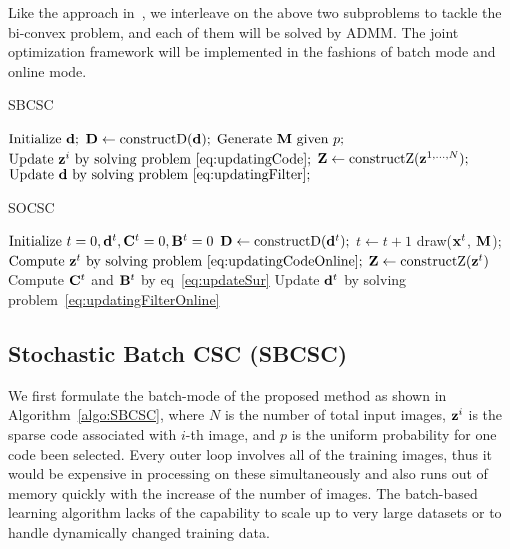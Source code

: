 Like the approach in~\cite{heide2015fast}, we interleave on the above two subproblems to tackle the bi-convex problem, and each of them will be solved by ADMM. The joint optimization framework will be implemented in the fashions of batch mode and online mode.

\begin{minipage}[t]{0.5\textwidth}
\vspace{0pt}
\begin{algorithm}[H]
\caption{SBCSC} \label{algo:SBCSC}
\begin{algorithmic}[1]
\State $\text{Initialize} ~ \filter;$
    \State $\Filter \gets \text{constructD}(\filter);$
        \State $ \text{Generate } \mask \text{ given } p;$
        \State $ \text{Update } \code^i \text{ by solving problem~\ref{eq:updatingCode}};$
    \EndFor
    \State $\Code \gets \text{constructZ}(\code^{1,...,N});$
    \State $\text{Update } \filter \text{ by solving problem~\ref{eq:updatingFilter}} ;$
\EndWhile
\end{algorithmic}
\end{algorithm}
\end{minipage}
\begin{minipage}[t]{0.5\textwidth}
\vspace{0pt}
\begin{algorithm}[H]
\caption{SOCSC} \label{algo:SOCSC}
\begin{algorithmic}[1]
\State $\text{Initialize} ~ t=0, \filter^t,  \surC^t = 0, \surB^t = 0$
    \State $\Filter \gets \text{constructD}(\filter^t);$
    \State $t \gets t+1$
    \State draw($\signal^t$, $\mask$);
    \State $ \text{Compute } \code^t \text{ by solving problem~\ref{eq:updatingCodeOnline}};$
    \State $\Code \gets \text{constructZ}(\code^t)$
    \State Compute $\surC^t$ and $\surB^t$ by eq~\ref{eq:updateSur}
    \State Update $\filter^t$ by solving problem~\ref{eq:updatingFilterOnline}
\EndWhile
\end{algorithmic}
\end{algorithm}
\end{minipage}

\subsection{Stochastic Batch CSC (SBCSC)}
We first formulate the batch-mode of the proposed method as shown in Algorithm~\ref{algo:SBCSC}, where $N$ is the number of total input images, $\code^i$ is the sparse code associated with $i$-th image, and $p$ is the uniform probability for one code been selected. Every outer loop involves all of the training images, thus it would be expensive in processing on these simultaneously and also runs out of memory quickly with the increase of the number of images. The batch-based learning algorithm lacks of the capability to scale up to very large datasets or to handle dynamically changed training data.


